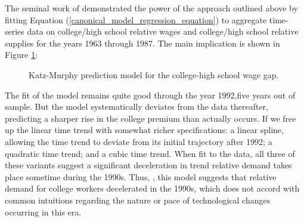 \documentclass[12pt]{article}
\newcommand{\highlightP}[1]{{\emph{\color{MyPink}{#1}}}}
\theoremstyle{definition}
\begin{document}
The seminal work of \citet{katzChangesRelativeWages1992} demonstrated the power of the approach outlined above by fitting Equation (\ref{canonical_model_regression_equation}) to aggregate time-series data on college/high school relative wages and college/high school relative supplies for the years 1963 through 1987. The main implication is shown in Figure \ref{fig_KatzMurphy_predictions}:
\begin{figure}[H]
    \noindent\caption{Katz-Murphy prediction model for the college-high school wage gap.}
    \begin{center}
        \label{fig_KatzMurphy_predictions}
    \end{center}
\end{figure}
The fit of the model remains quite good through the year 1992,five years out of sample. But the model systematically deviates from the data thereafter, predicting a sharper rise in the college premium than actually occurs. If we free up the linear time trend with somewhat richer specifications: a linear spline, allowing the time trend to deviate from its initial trajectory after 1992; a quadratic time trend; and a cubic time trend. When fit to the data, all three of these variants suggest a significant deceleration in trend relative demand takes place sometime during the 1990s. Thus, \highlightP{taken at face value}, this model suggests that relative demand for college workers decelerated in the 1990s, which does not accord with common intuitions regarding the nature or pace of technological changes occurring in this era. 
\end{document}
